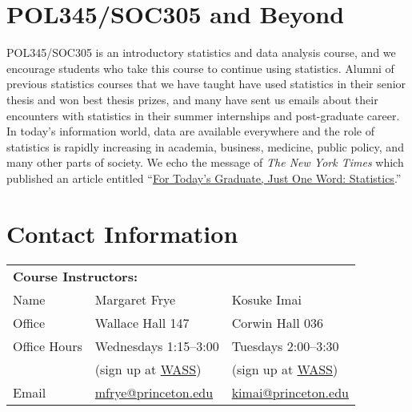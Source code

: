 \documentclass[11pt]{article}
\begin{document}
\section{POL345/SOC305 and Beyond}

POL345/SOC305 is an introductory statistics and data analysis course,
and we encourage students who take this course to continue using
statistics. Alumni of previous statistics courses that we have taught
have used statistics in their senior thesis and won best thesis
prizes, and many have sent us emails about their encounters with
statistics in their summer internships and post-graduate career.  In
today's information world, data are available everywhere and the role
of statistics is rapidly increasing in academia, business, medicine,
public policy, and many other parts of society.  We echo the
message of {\it The New York Times} which published an article
entitled
``\href{http://www.nytimes.com/2009/08/06/technology/06stats.html?_r=1}{For
  Today's Graduate, Just One Word: Statistics}.''

\section{Contact Information}

\begin{tabular}{lp{1.5in}p{1.75in}}
  \multicolumn{2}{l}{\textbf{Course Instructors:}}\\
  {\sc Name} &  Margaret Frye & Kosuke Imai  \\
  {\sc Office} &  Wallace Hall 147 & Corwin Hall 036    \\
  {\sc Office Hours} & Wednesdays 1:15--3:00 & Tuesdays 2:00--3:30\\ & (sign up at \href{https://wass.princeton.edu/}{WASS}) & (sign up at \href{https://wass.princeton.edu/}{WASS}) \\
  {\sc Email} & \href{mailto:mfrye@princeton.edu}{mfrye@princeton.edu} & \href{mailto:kimai@princeton.edu}{kimai@princeton.edu} \\
\end{tabular}
\vspace{5mm}
\end{document}
